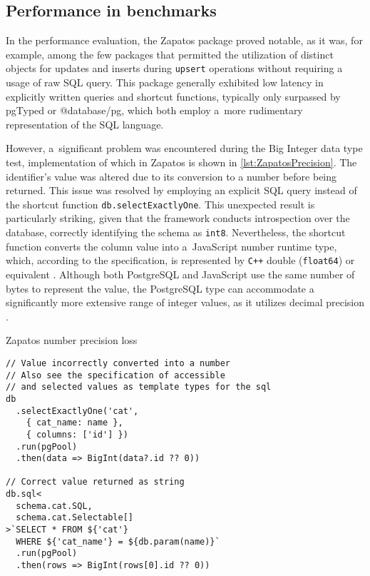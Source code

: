 \subsection*{Performance in benchmarks}

In the performance evaluation, the Zapatos package proved notable, as it was,
for example, among the few packages that permitted the utilization of distinct
objects for updates and inserts during \texttt{upsert} operations without
requiring a usage of raw SQL query. This package generally exhibited low latency
in explicitly written queries and shortcut functions, typically only surpassed
by pgTyped or @database/pg, which both employ a~more rudimentary representation
of the SQL language.

However, a~significant problem was encountered during the Big Integer data type
test, implementation of which in Zapatos is shown in
\autoref{lst:ZapatosPrecision}. The identifier's value was altered due to its
conversion to a number before being returned. This issue was resolved by
employing an explicit SQL query instead of the shortcut function
\texttt{db.selectExactlyOne}. This unexpected result is particularly striking,
given that the framework conducts introspection over the database, correctly
identifying the schema as \texttt{int8}. Nevertheless, the shortcut function
converts the column value into a~JavaScript number runtime type, which,
according to the specification, is represented by \texttt{C++} double
(\texttt{float64}) or equivalent \cite{MDNNumber}. Although both PostgreSQL and
JavaScript use the same number of bytes to represent the value, the PostgreSQL
type can accommodate a significantly more extensive range of integer values, as
it utilizes decimal precision \cite{PostgresNumeric}.

\begin{listing}
\caption{Zapatos number precision loss}
\label{lst:ZapatosPrecision}
\begin{verbatim}
// Value incorrectly converted into a number
// Also see the specification of accessible 
// and selected values as template types for the sql
db
  .selectExactlyOne('cat', 
    { cat_name: name }, 
    { columns: ['id'] })
  .run(pgPool)
  .then(data => BigInt(data?.id ?? 0))

// Correct value returned as string
db.sql<
  schema.cat.SQL,
  schema.cat.Selectable[]
>`SELECT * FROM ${'cat'} 
  WHERE ${'cat_name'} = ${db.param(name)}`
  .run(pgPool)
  .then(rows => BigInt(rows[0].id ?? 0))
\end{verbatim}
\end{listing}


